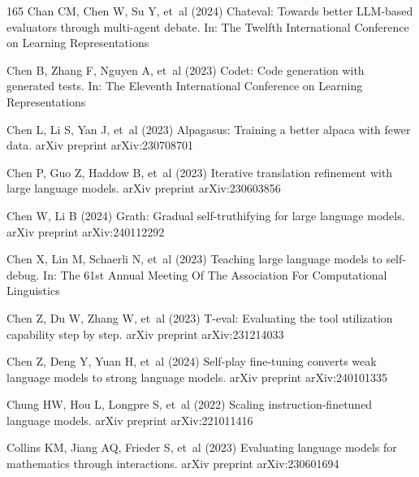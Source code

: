 \documentclass[sn-basic, Numbered]{sn-jnl}%
\theoremstyle{thmstyleone}%
\theoremstyle{thmstyletwo}%
\theoremstyle{thmstylethree}%
\begin{document}
\begin{thebibliography}{165}
Chan CM, Chen W, Su Y, et~al (2024) Chateval: Towards better {LLM}-based evaluators through multi-agent debate. In: The Twelfth International Conference on Learning Representations

Chen B, Zhang F, Nguyen A, et~al (2023{}) Codet: Code generation with generated tests. In: The Eleventh International Conference on Learning Representations

Chen L, Li S, Yan J, et~al (2023{}) Alpagasus: Training a better alpaca with fewer data. arXiv preprint arXiv:230708701

Chen P, Guo Z, Haddow B, et~al (2023{}) Iterative translation refinement with large language models. arXiv preprint arXiv:230603856

Chen W, Li B (2024) Grath: Gradual self-truthifying for large language models. arXiv preprint arXiv:240112292

Chen X, Lin M, Schaerli N, et~al (2023{}) Teaching large language models to self-debug. In: The 61st Annual Meeting Of The Association For Computational Linguistics

Chen Z, Du W, Zhang W, et~al (2023{}) T-eval: Evaluating the tool utilization capability step by step. arXiv preprint arXiv:231214033

Chen Z, Deng Y, Yuan H, et~al (2024) Self-play fine-tuning converts weak language models to strong language models. arXiv preprint arXiv:240101335

Chung HW, Hou L, Longpre S, et~al (2022) Scaling instruction-finetuned language models. arXiv preprint arXiv:221011416

Collins KM, Jiang AQ, Frieder S, et~al (2023) Evaluating language models for mathematics through interactions. arXiv preprint arXiv:230601694


\end{thebibliography}
\end{document}
